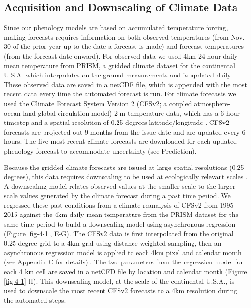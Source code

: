 \subsection{Acquisition and Downscaling of Climate Data}

Since our phenology models are based on accumulated temperature forcing, making forecasts requires information on both observed temperatures (from Nov. 30 of the prior year up to the date a forecast is made) and forecast temperatures (from the forecast date onward). For observed data we used 4km 24-hour daily mean temperature from PRISM, a gridded climate dataset for the continental U.S.A. which interpolates on the ground measurements and is updated daily \citep{prismdata}. These observed data are saved in a netCDF file, which is appended with the most recent data every time the automated forecast is run. For climate forecasts we used the Climate Forecast System Version 2 (CFSv2;  a coupled atmosphere-ocean-land global circulation model) 2-m temperature data, which has a 6-hour timestep and a spatial resolution of 0.25 degrees latitude/longitude \citep{saha2014}. CFSv2 forecasts are projected out 9 months from the issue date and are updated every 6 hours. The five most recent climate forecasts are downloaded for each updated phenology forecast to accommodate uncertainty (see Prediction).

Because the gridded climate forecasts are issued at large spatial resolutions (0.25 degrees), this data requires downscaling to be used at ecologically relevant scales \citep{cook2010}. A downscaling model relates observed values at the smaller scale to the larger scale values generated by the climate forecast during a past time period. We regressed these past conditions from a climate reanalysis of CFSv2 from 1995-2015 \citep{saha2010} against the 4km daily mean temperature from the PRISM dataset for the same time period \citep{prismdata} to build a downscaling model using asynchronous regression (Figure \ref{fig-4-1}, E-G). The CFSv2 data is first interpolated from the original 0.25 degree grid to a 4km grid using distance weighted sampling, then an asynchronous regression model is applied to each 4km pixel and calendar month (see Appendix C for details) \citep{stoner2013}. The two parameters from the regression model for each 4 km cell are saved in a netCFD file by location and calendar month (Figure \ref{fig-4-1}-H). This downscaling model, at the scale of the continental U.S.A., is used to downscale the most recent CFSv2 forecasts to a 4km resolution during the automated steps. 

